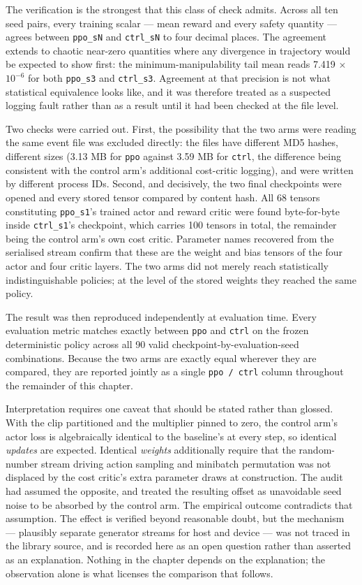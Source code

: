 The verification is the strongest that this class of check admits. Across all ten seed pairs,
every training scalar --- mean reward and every safety quantity --- agrees between \texttt{ppo\_sN} and
\texttt{ctrl\_sN} to four decimal places. The agreement extends to chaotic near-zero quantities where any
divergence in trajectory would be expected to show first: the minimum-manipulability tail mean
reads 7.419 \(\times\) \(10^{-6}\) for both \texttt{ppo\_s3} and \texttt{ctrl\_s3}. Agreement at that precision is not what
statistical equivalence looks like, and it was therefore treated as a suspected logging fault
rather than as a result until it had been checked at the file level.

Two checks were carried out. First, the possibility that the two arms were reading the same
event file was excluded directly: the files have different MD5 hashes, different sizes (3.13 MB
for \texttt{ppo} against 3.59 MB for \texttt{ctrl}, the difference being consistent with the control arm's
additional cost-critic logging), and were written by different process IDs. Second, and
decisively, the two final checkpoints were opened and every stored tensor compared by content
hash. All 68 tensors constituting \texttt{ppo\_s1}'s trained actor and reward critic were found
byte-for-byte inside \texttt{ctrl\_s1}'s checkpoint, which carries 100 tensors in total, the remainder
being the control arm's own cost critic. Parameter names recovered from the serialised stream
confirm that these are the weight and bias tensors of the four actor and four critic layers. The
two arms did not merely reach statistically indistinguishable policies; at the level of the
stored weights they reached the same policy.

The result was then reproduced independently at evaluation time. Every evaluation metric matches
exactly between \texttt{ppo} and \texttt{ctrl} on the frozen deterministic policy across all 90 valid
checkpoint-by-evaluation-seed combinations. Because the two arms are exactly equal wherever they
are compared, they are reported jointly as a single \texttt{ppo\ /\ ctrl} column throughout the remainder
of this chapter.

Interpretation requires one caveat that should be stated rather than glossed. With the clip
partitioned and the multiplier pinned to zero, the control arm's actor loss is algebraically
identical to the baseline's at every step, so identical \emph{updates} are expected. Identical
\emph{weights} additionally require that the random-number stream driving action sampling and
minibatch permutation was not displaced by the cost critic's extra parameter draws at
construction. The audit had assumed the opposite, and treated the resulting offset as unavoidable
seed noise to be absorbed by the control arm. The empirical outcome contradicts that assumption.
The effect is verified beyond reasonable doubt, but the mechanism --- plausibly separate generator
streams for host and device --- was not traced in the library source, and is recorded here as an
open question rather than asserted as an explanation. Nothing in the chapter depends on the
explanation; the observation alone is what licenses the comparison that follows.

